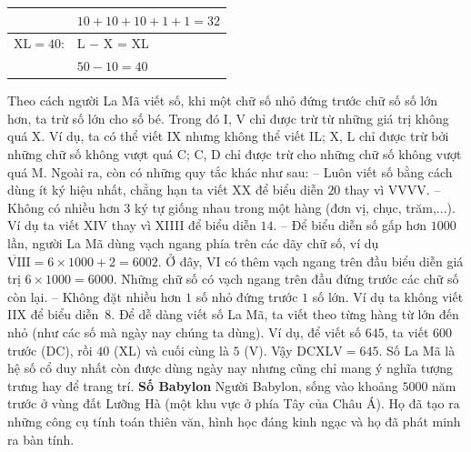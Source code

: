 \begin{multicols}{2}
\begin{table}[H]
\begin{tabular}{|l l|}
				&$10 +10 +10+1+1=32$\\
				\hline
				XL$= 40$:&     L $-$ X = XL\\
				&$50 - 10 = 40$\\
				\hline
		\end{tabular}
		\vspace*{-10pt}
	\end{table}
	Theo cách người La Mã viết số, khi một chữ số nhỏ đứng trước chữ số số lớn hơn, ta trừ số lớn cho số bé. Trong đó I, V chỉ được trừ từ những giá trị không quá X. Ví dụ, ta có thể viết IX nhưng không thể viết IL; X, L chỉ được trừ bởi những chữ số không vượt quá C; C, D chỉ được trừ cho những chữ số không vượt quá M. Ngoài ra, còn có những quy tắc khác như sau:
	\vskip 0.1cm
	-- Luôn viết số bằng cách dùng ít ký hiệu nhất, chẳng hạn ta viết XX để biểu diễn $20$ thay vì VVVV.
	\vskip 0.1cm
	-- Không có nhiều hơn $3$ ký tự giống nhau trong một hàng (đơn vị, chục, trăm,...). Ví dụ ta viết XIV thay vì XIIII để biểu diễn $14$.
	\vskip 0.1cm
	-- Để biểu diễn số gấp hơn $1000$ lần, người La Mã dùng vạch ngang phía trên các dãy chữ số, ví dụ $\overline{\text{VI}}\text{II}=6\times 1000+2=6002$. Ở đây, VI có thêm vạch ngang trên đầu biểu diễn giá trị $6\times 1000 = 6000$. Những chữ số có vạch ngang trên đầu đứng trước các chữ số còn lại.
	\vskip 0.1cm
	-- Không đặt nhiều hơn $1$ số nhỏ đứng trước $1$ số lớn. Ví dụ ta không viết IIX để biểu diễn~$8$.
	\vskip 0.1cm
	Để dễ dàng viết số La Mã, ta viết theo từng hàng từ  lớn đến nhỏ (như các số mà ngày nay chúng ta dùng). Ví dụ, để viết số $645$, ta viết $600$ trước (DC), rồi $40$ (XL) và cuối cùng là $5$ (V). Vậy $\text{DCXLV}=645$.
	Số La Mã là hệ số cổ duy nhất còn được dùng ngày nay nhưng cũng chỉ mang ý nghĩa tượng trưng hay để trang trí.
	\vskip 0.1cm
	\columnbreak
	\textbf{\color{toancuabi}Số Babylon}
	\vskip 0.1cm
	Người Babylon, sống vào khoảng $5000$ năm trước ở vùng đất Lưỡng Hà (một khu vực ở phía Tây của  Châu Á). Họ đã tạo ra những công cụ tính toán thiên văn, hình học đáng kinh ngạc và họ đã phát minh ra bàn tính.
		\begin{figure}[H]
		\centering
		\vspace*{-5pt}
		\captionsetup{labelformat= empty, justification=centering}

\end{figure}
\end{multicols}
